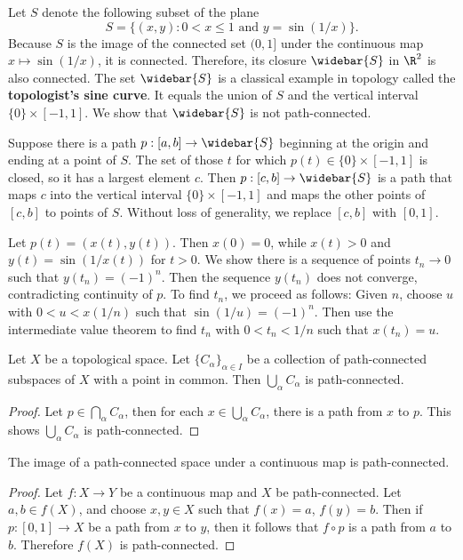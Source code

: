 \begin{example}\label{topologist's sine curve}
Let $S$ denote the following subset of the plane
\[S=\{(x,y):\text{$0<x\leq 1$ and $y=\sin(1/x)$}\}.\]
Because $S$ is the image of the connected set $(0,1]$ under the continuous map $x\mapsto\sin(1/x)$, it is connected. Therefore, its closure $\widebar{S}$ in $\R^2$ is also connected. The set $\widebar{S}$ is a classical example in topology called the \textbf{topologist's sine curve}. It equals the union of $S$ and the vertical interval $\{0\}\times[-1,1]$. We show that $\widebar{S}$ is not path-connected.\par
Suppose there is a path $p:[a,b]\to\widebar{S}$ beginning at the origin and ending at a point of $S$. The set of those $t$ for which $p(t)\in\{0\}\times[-1,1]$ is closed, so it has a largest element $c$. Then $p:[c,b]\to\widebar{S}$ is a path that maps $c$ into the vertical interval $\{0\}\times[-1,1]$ and maps the other points of $[c,b]$ to points of $S$. Without loss of generality, we replace $[c,b]$ with $[0,1]$.\par
Let $p(t)=(x(t),y(t))$. Then $x(0)=0$, while $x(t)>0$ and $y(t)=\sin(1/x(t))$ for $t>0$. We show there is a sequence of points $t_n\to 0$ such that $y(t_n)=(-1)^n$. Then the sequence $y(t_n)$ does not converge, contradicting
continuity of $p$. To find $t_n$, we proceed as follows: Given $n$, choose $u$ with $0<u<x(1/n)$ such that $\sin(1/u)=(-1)^n$. Then use the intermediate value theorem to find $t_n$ with $0<t_n<1/n$ such that $x(t_n)=u$.
\end{example}
\begin{proposition}
Let $X$ be a topological space. Let $\{C_\alpha\}_{\alpha\in I}$ be a collection of path-connected subspaces of $X$ with a point in common. Then $\bigcup_{\alpha}C_\alpha$ is path-connected.
\end{proposition}
\begin{proof}
Let $p\in\bigcap_\alpha C_\alpha$, then for each $x\in \bigcup_\alpha C_\alpha$, there is a path from $x$ to $p$. This shows $\bigcup_\alpha C_\alpha$ is path-connected.
\end{proof}
\begin{proposition}
The image of a path-connected space under a continuous map is path-connected.
\end{proposition}
\begin{proof}
Let $f:X\to Y$ be a continuous map and $X$ be path-connected. Let $a,b\in f(X)$, and choose $x,y\in X$ such that $f(x)=a$, $f(y)=b$. Then if $p:[0,1]\to X$ be a path from $x$ to $y$, then it follows that $f\circ p$ is a path from $a$ to $b$. Therefore $f(X)$ is path-connected. 
\end{proof}
